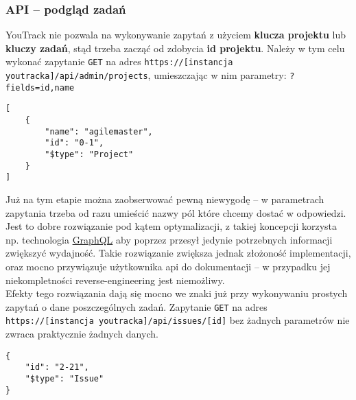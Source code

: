 \subsubsection*{API -- podgląd zadań}
YouTrack nie pozwala na wykonywanie zapytań z użyciem \textbf{klucza projektu} lub \textbf{kluczy zadań}, stąd trzeba zacząć od zdobycia \textbf{id projektu}.
Należy w tym celu wykonać zapytanie \texttt{GET} na adres \texttt{https://[instancja youtracka]/api/admin/projects}, umieszczając w nim parametry: \texttt{?fields=id,name}
\begin{lstlisting}[caption=Zapytanie o id oraz nazwę wszystkich projektów (YouTrack)]
[
    {
        "name": "agilemaster",
        "id": "0-1",
        "$type": "Project"
    }
]
\end{lstlisting}
Już na tym etapie można zaobserwować pewną niewygodę -- w parametrach zapytania trzeba od razu umieścić nazwy pól które chcemy dostać w odpowiedzi.
Jest to dobre rozwiązanie pod kątem optymalizacji, z takiej koncepcji korzysta np. technologia \href{https://graphql.org/}{GraphQL} aby poprzez przesył jedynie potrzebnych informacji zwiększyć wydajność.
Takie rozwiązanie zwiększa jednak złożoność implementacji, oraz mocno przywiązuje użytkownika api do dokumentacji -- w przypadku jej niekompletności reverse-engineering jest niemożliwy.\\
Efekty tego rozwiązania dają się mocno we znaki już przy wykonywaniu prostych zapytań o dane poszczególnych zadań.
Zapytanie \texttt{GET} na adres \texttt{https://[instancja youtracka]/api/issues/[id]} bez żadnych parametrów nie zwraca praktycznie żadnych danych.
\begin{lstlisting}[caption=Dane z zapytania o pojedyncze zadanie bez parametrów (YouTrack)]
{
    "id": "2-21",
    "$type": "Issue"
}
\end{lstlisting}
